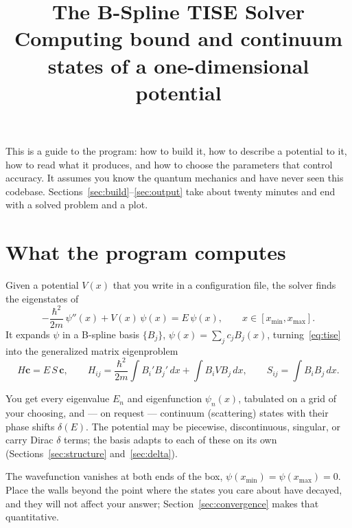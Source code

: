 \documentclass[11pt]{article}
\title{\textbf{The B-Spline TISE Solver}\\[2ex]
       \large Computing bound and continuum states of a one-dimensional potential}
\author{}
\date{}
\begin{document}
\maketitle
\thispagestyle{empty}

\begin{center}
\begin{minipage}{0.88\textwidth}
\small
This is a guide to the program: how to build it, how to describe a potential to
it, how to read what it produces, and how to choose the parameters that control
accuracy. It assumes you know the quantum mechanics and have never seen this
codebase. Sections~\ref{sec:build}--\ref{sec:output} take about twenty minutes
and end with a solved problem and a plot.
\end{minipage}
\end{center}

\vspace{2ex}
\tableofcontents
\newpage

\section{What the program computes}
\label{sec:scope}

Given a potential $V(x)$ that you write in a configuration file, the solver
finds the eigenstates of
\begin{equation}
  -\frac{\hbar^{2}}{2m}\,\psi''(x) + V(x)\,\psi(x) = E\,\psi(x),
  \qquad x \in [x_{\min}, x_{\max}].
  \label{eq:tise}
\end{equation}
It expands $\psi$ in a B-spline basis $\{B_j\}$, $\psi(x) = \sum_j c_j B_j(x)$,
turning~\eqref{eq:tise} into the generalized matrix eigenproblem
\begin{equation}
  H\mathbf{c} = E\,S\,\mathbf{c},
  \qquad
  H_{ij} = \frac{\hbar^{2}}{2m}\!\int\! B_i' B_j'\,dx + \!\int\! B_i V B_j\,dx,
  \qquad
  S_{ij} = \int\! B_i B_j\,dx .
  \label{eq:gep}
\end{equation}

You get every eigenvalue $E_n$ and eigenfunction $\psi_n(x)$, tabulated on a
grid of your choosing, and --- on request --- continuum (scattering) states
with their phase shifts $\delta(E)$. The potential may be piecewise,
discontinuous, singular, or carry Dirac $\delta$ terms; the basis adapts to
each of these on its own (Sections~\ref{sec:structure} and~\ref{sec:delta}).

The wavefunction vanishes at both ends of the box,
$\psi(x_{\min}) = \psi(x_{\max}) = 0$. Place the walls beyond the point where
the states you care about have decayed, and they will not affect your answer;
Section~\ref{sec:convergence} makes that quantitative.
\end{document}
